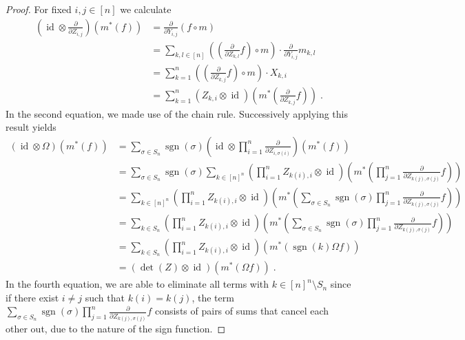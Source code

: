 \begin{proof}
  For fixed $i,j \in [ n ] $ we calculate
  \begin{equation*}
    \begin{aligned}
    \left( \operatorname{id} \otimes \frac{\partial}{\partial Z_{i,j}} \right) \left( m^\ast \left( f \right) \right)
    &= \frac{\partial}{\partial Y_{i,j}} \left( f \circ m \right)\\
    &= \sum_{k,l \in [ n ]} \left( \left( \frac{\partial}{\partial Z_{k,l}} f \right) \circ m \right) \cdot \frac{\partial}{\partial Y_{i,j}} m_{k,l} \\
    &= \sum_{k = 1}^n \left( \left( \frac{\partial}{\partial Z_{k,j}} f \right) \circ m \right) \cdot X_{k,i}\\
    &= \sum_{k=1}^n \left( Z_{k,i} \otimes \operatorname{id} \right) \left( m^\ast \left( \frac{\partial}{\partial Z_{k,j}} f \right) \right) \; .
    \end{aligned}
  \end{equation*}
  In the second equation, we made use of the chain rule.
  Successively applying this result yields
  \begin{equation*}
    \begin{aligned}
      \left( \operatorname{id} \otimes \Omega \right) \left( m^\ast \left( f \right) \right)
      &= \sum_{\sigma \in S_n} \operatorname{sgn} \left( \sigma \right) \left( \operatorname{id} \otimes \prod_{i=1}^n \frac{\partial}{\partial Z_{i,\sigma \left( i \right)}} \right) \left( m^\ast \left( f \right) \right) \\
      &= \sum_{\sigma \in S_n} \operatorname{sgn} \left( \sigma \right) \sum_{k \in [ n ]^n} \left( \prod_{i=1}^n Z_{k(i),i} \otimes \operatorname{id} \right) \left( m^\ast \left( \prod_{j=1}^n \frac{\partial}{\partial Z_{k(j),\sigma (j)}} f \right) \right) \\
      &= \sum_{k \in [ n ]^n} \left( \prod_{i=1}^n Z_{k(i),i}  \otimes \operatorname{id} \right) \left( m^\ast \left( \sum_{\sigma \in S_n} \operatorname{sgn} \left( \sigma \right) \prod_{j=1}^n \frac{\partial}{\partial Z_{k(j),\sigma (j)}} f \right) \right) \\
      &= \sum_{k \in S_n} \left( \prod_{i=1}^n Z_{k(i),i} \otimes \operatorname{id} \right) \left( m^\ast \left( \sum_{\sigma \in S_n} \operatorname{sgn} \left( \sigma \right) \prod_{j=1}^n \frac{\partial}{\partial Z_{k(j),\sigma (j)}} f \right) \right) \\
      &= \sum_{k \in S_n} \left( \prod_{i=1}^n Z_{k(i),i} \otimes \operatorname{id} \right) \left( m^\ast \left( \operatorname{sgn} (k) \Omega f \right) \right)\\
      &= \left( \operatorname{det} (Z) \otimes \operatorname{id} \right) \left( m^\ast \left( \Omega f \right) \right) \; .
    \end{aligned}
  \end{equation*}
  In the fourth equation, we are able to eliminate all terms with $k \in [n]^n \setminus S_n$ since if there exist $i\neq j$ such that $k(i)=k(j)$, the term $\sum_{\sigma \in S_n} \operatorname{sgn} \left( \sigma \right) \prod_{j=1}^n \frac{\partial}{\partial Z_{k(j),\sigma (j)}} f$ consists of pairs of sums that cancel each other out, due to the nature of the sign function.
  

\end{proof}
